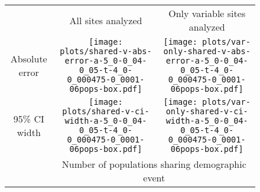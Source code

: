 \documentclass[border=10pt,varwidth=30cm]{standalone}
\begin{document}
\begin{figure}
    \centering
    \begin{tabular}{@{}ccc@{}}
        & \multirow{1}{0.15\textwidth}{\Large\centering All sites analyzed}
        & \multirow{1}{0.15\textwidth}{\Large\centering Only variable sites analyzed} \\[5ex]
        \multirow{1}{*}[8em]{\begin{sideways}\large Absolute error\end{sideways}}
        & \texttt{[image: plots/shared-v-abs-error-a-5\_0-0\_04-0\_05-t-4\_0-0\_000475-0\_0001-06pops-box.pdf]}
        & \texttt{[image: plots/var-only-shared-v-abs-error-a-5\_0-0\_04-0\_05-t-4\_0-0\_000475-0\_0001-06pops-box.pdf]} \\
        \multirow{1}{*}[7.5em]{\begin{sideways}\large 95\% CI width\end{sideways}}
        & \texttt{[image: plots/shared-v-ci-width-a-5\_0-0\_04-0\_05-t-4\_0-0\_000475-0\_0001-06pops-box.pdf]}
        & \texttt{[image: plots/var-only-shared-v-ci-width-a-5\_0-0\_04-0\_05-t-4\_0-0\_000475-0\_0001-06pops-box.pdf]} \\
        & \multicolumn{2}{c}{\large Number of populations sharing demographic event} \\
    \end{tabular}
\end{figure}
\end{document}
